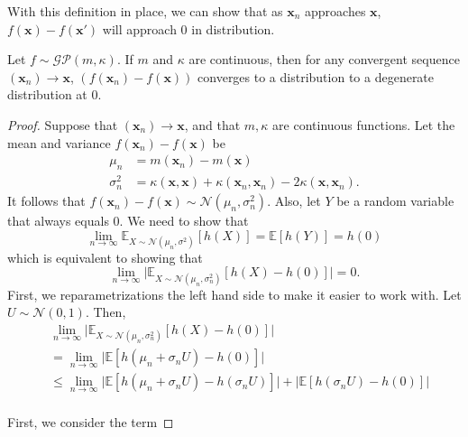With this definition in place, we can show that as $\mathbf{x}_n$ approaches $\mathbf{x}$, $f(\mathbf{x}) - f(\mathbf{x}')$ will approach 0 in distribution.
\begin{theorem}
    Let $f \sim \mathcal{GP}(m, \kappa)$.
    If $m$ and $\kappa$ are continuous, then for any convergent sequence $(\mathbf{x}_n) \to \mathbf{x}$, $(f(\mathbf{x}_n) - f(\mathbf{x}))$ converges to a distribution to a degenerate distribution at 0.
\end{theorem}
\begin{proof}
    Suppose that $(\mathbf{x}_n) \to \mathbf{x}$, and that $m, \kappa$ are continuous functions.
    Let the mean and variance $f(\mathbf{x}_n) - f(\mathbf{x})$ be
    \begin{align*}
        \mu_n & = m(\mathbf{x}_n) - m(\mathbf{x}) \\
        \sigma_n^2 & = \kappa(\mathbf{x}, \mathbf{x}) + \kappa(\mathbf{x}_n, \mathbf{x}_n) - 2\kappa(\mathbf{x}, \mathbf{x}_n).
    \end{align*}
    It follows that $f(\mathbf{x}_n) -f(\mathbf{x}) \sim \mathcal{N}(\mu_n, \sigma^2_n)$.
    Also, let $Y$ be a random variable that always equals 0.
    We need to show that
    \begin{equation*}
        \lim_{n \to \infty}\mathbb{E}_{X \sim \mathcal{N}(\mu_n, \sigma^2)}[h(X)] = \mathbb{E}[h(Y)] = h(0)
    \end{equation*}
    which is equivalent to showing that
    \begin{equation*}
        \lim_{n \to \infty} \lvert \mathbb{E}_{X \sim \mathcal{N}(\mu_n, \sigma_n^2)}[h(X) - h(0)] \rvert = 0.
    \end{equation*}
    First, we reparametrizations the left hand side to make it easier to work with.
    Let $U \sim \mathcal{N}(0, 1)$.
    Then,
    \begin{align*}
        & \lim_{n \to \infty} \lvert \mathbb{E}_{X \sim \mathcal{N}(\mu_n, \sigma_n^2)}[h(X) - h(0)] \rvert \\
        & =
        \lim_{n \to \infty} \lvert \mathbb{E}[h(\mu_n + \sigma_n U) - h(0)] \rvert \\
        & \leq
        \lim_{n \to \infty}
        \lvert \mathbb{E}[h(\mu_n + \sigma_n U) - h(\sigma_n U)] \rvert
        +
        \lvert \mathbb{E}[h(\sigma_nU) - h(0)] \rvert \\
    \end{align*}

    First, we consider the term


\end{proof}
